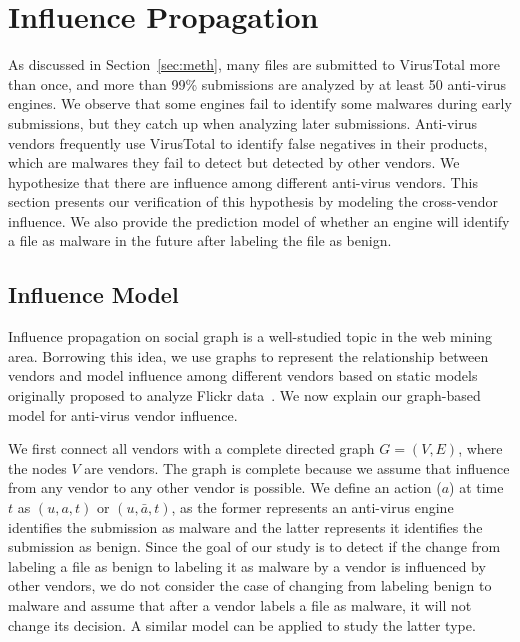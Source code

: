 \section{Influence Propagation}
\label{sec:influ}

As discussed in Section~\ref{sec:meth}, many files are submitted to VirusTotal more than once, 
and more than 99\% submissions are analyzed by at least 50 anti-virus engines. 
We observe that some engines fail to identify some malwares during early submissions, 
but they catch up when analyzing later submissions. 
Anti-virus vendors frequently use VirusTotal to identify false negatives in their products, 
which are malwares they fail to detect but detected by other vendors. 
We hypothesize that there are influence among different anti-virus vendors.
This section presents our verification of this hypothesis by modeling the cross-vendor influence.
We also provide the prediction model of whether an engine will identify a file as malware in the future
after labeling the file as benign.

\subsection{Influence Model}
\label{sec:model}
Influence propagation on social graph is a well-studied topic in the web mining area. 
Borrowing this idea, we use graphs to represent the relationship between vendors 
and model influence among different vendors based on static models 
originally proposed to analyze Flickr data~\cite{Influence}.
We now explain our graph-based model for anti-virus vendor influence.

We first connect all vendors with a complete directed graph $G = (V, E)$, 
where the nodes $V$ are vendors. 
The graph is complete because we assume that influence from any vendor to any other vendor is possible.
We define an action ($a$) at time $t$ as $(u, a, t)$ or $(u, \bar{a}, t)$,
as the former represents an anti-virus engine identifies the submission as malware 
and the latter represents it identifies the submission as benign.
Since the goal of our study is to detect if the change from labeling a file as benign to labeling it as malware by a vendor is influenced by other vendors, 
we do not consider the case of changing from labeling benign to malware and assume that after a vendor labels a file as malware, it will not change its decision.
A similar model can be applied to study the latter type.


